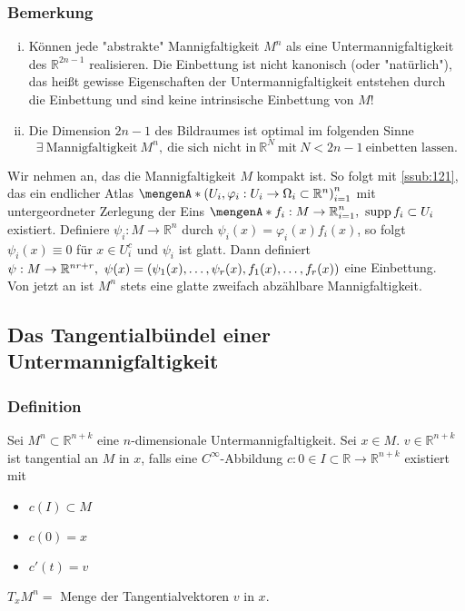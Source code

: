 \subsubsection{Bemerkung}
\label{ssub:124}
\begin{enumerate}[(i)]
\item Können jede "abstrakte" Mannigfaltigkeit $M^n$ als eine Untermannigfaltigkeit des $\mathds{R}^{2n-1}$ realisieren.
Die Einbettung ist nicht kanonisch (oder "natürlich"), das heißt gewisse Eigenschaften der Untermannigfaltigkeit entstehen durch die Einbettung und sind keine intrinsische Einbettung von $M$!
\item Die Dimension $2n-1$ des Bildraumes ist optimal im folgenden Sinne
\[
\exists\ \text{Mannigfaltigkeit}\ M^n,\ \text{die sich nicht in}\ \mathds{R}^N\ \text{mit}\ N<2n-1\ \text{einbetten lassen.}
\]
\end{enumerate}
Wir nehmen an, das die Mannigfaltigkeit $M$ kompakt ist. So folgt mit \ref{ssub:121}, das ein endlicher Atlas $\set{\enbrace{U_i,\varphi_i : U_i \to \Omega_i\subset \mathds{R}^n}}_{i=1}^n$ mit untergeordneter Zerlegung der Eins $\set{f_i:M\to \mathds{R}}_{i=1}^n,\ \supp f_i \subset U_i$ existiert. Definiere $\psi_i:M\to \mathds{R}^n$ durch $\psi_i(x) = \varphi_i(x)f_i(x)$, so folgt $\psi_i(x) \equiv 0$ für $x\in U_i^c$ und $\psi_i$ ist glatt. Dann definiert $\psi: M\to \mathds{R}^{nr+r},\ \psi(x)=\enbrace{\psi_1(x),\ldots,\psi_r(x),f_1(x),\ldots,f_r(x)}$ eine Einbettung.\\
Von jetzt an ist $M^n$ stets eine glatte zweifach abzählbare Mannigfaltigkeit.


\subsection{Das Tangentialbündel einer Untermannigfaltigkeit}
\label{sub:14}

\subsubsection{Definition}
\label{ssub:125}
Sei $M^n\subset \mathds{R}^{n+k}$ eine $n$-dimensionale Untermannigfaltigkeit. Sei $x\in M$. $v\in \mathds{R}^{n+k}$ ist tangential an $M$ in $x$, falls eine $C^{\infty}$-Abbildung $c: 0\in I\subset \mathds{R} \to \mathds{R}^{n+k}$ existiert mit
\begin{itemize}
\item $c(I)\subset M$
\item $c(0) = x$
\item $c'(t) = v$
\end{itemize}
$T_x M^n = $ Menge der Tangentialvektoren $v$ in $x$.

